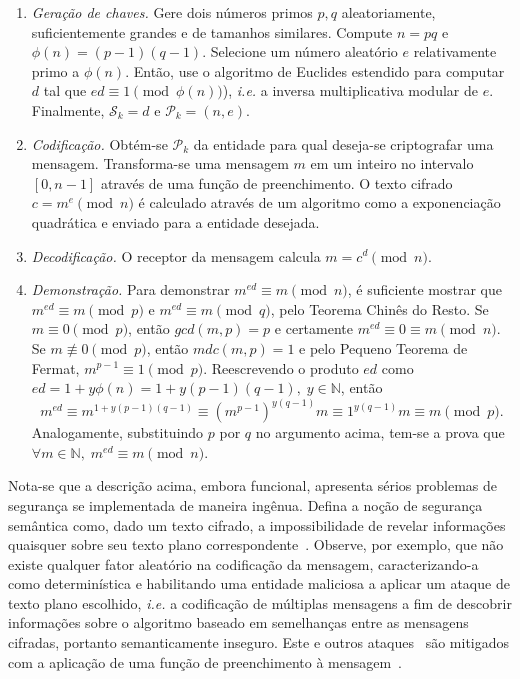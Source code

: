 \documentclass[12pt,notitlepage]{report}
\newcommand{\pk}{\mathcal{P}_k}
\begin{document}
\begin{enumerate}

  \item[] \emph{Geração de chaves.} Gere dois números primos $p, q$
      aleatoriamente, suficientemente grandes e de tamanhos similares. Compute
        $n = p q$ e $\phi(n) = (p - 1) (q - 1)$. Selecione um número aleatório
        $e$ relativamente primo a $\phi(n)$. Então, use o algoritmo de Euclides
        estendido para computar $d$ tal que $ed \equiv 1 \pmod{\phi(n)}$), \emph{i.e.}
        a inversa multiplicativa modular de $e$. Finalmente, $\mathcal{S}_k =
        d$ e $\mathcal{P}_k = (n, e)$.

  \item[] \emph{Codificação.} Obtém-se $\pk{}$ da entidade para qual deseja-se
      criptografar uma mensagem. Transforma-se uma mensagem $m$ em um inteiro
        no intervalo $[0, n - 1]$ através de uma função de preenchimento.  O
        texto cifrado $c = m^e \pmod{n}$ é calculado através de um algoritmo
        como a exponenciação quadrática e enviado para a entidade desejada.

  \item[] \emph{Decodificação.} O receptor da mensagem calcula $m = c^d
      \pmod{n}$.

  \item[] \emph{Demonstração.} Para demonstrar $m^{ed} \equiv m \pmod{n}$, é
      suficiente mostrar que $m^{ed} \equiv m \pmod{p}$ e $m^{ed} \equiv m
        \pmod{q}$, pelo Teorema Chinês do Resto. Se $m \equiv 0 \pmod{p}$,
        então $gcd(m, p) = p$ e certamente $m^{ed} \equiv 0 \equiv m \pmod{n}$.
        Se $m \not\equiv 0 \pmod{p}$, então $mdc(m, p) = 1$ e pelo Pequeno
        Teorema de Fermat, $m^{p - 1} \equiv 1 \pmod{p}$. Reescrevendo o
        produto $ed$ como $ed = 1 + y\phi(n) = 1 + y(p - 1)(q - 1), \; y \in
        \mathbb{N}$, então
        \begin{equation}
          m^{ed} \equiv m^{1 + y(p-1)(q-1)} \equiv
            (m^{p-1})^{y(q-1)}m \equiv 1^{y(q-1)}m \equiv m \pmod{p}.
        \end{equation}
        Analogamente, substituindo $p$ por $q$ no argumento acima, tem-se a
        prova que $\forall m \in \mathbb{N}, \; m^{ed} \equiv m \pmod{n}$.

\end{enumerate}

Nota-se que a descrição acima, embora funcional, apresenta sérios problemas de
segurança se implementada de maneira ingênua. Defina a noção de segurança
semântica como, dado um texto cifrado, a impossibilidade de revelar
informações quaisquer sobre seu texto plano
correspondente~\cite{Goldwasser:1982:PEA:800070.802212}. Observe, por exemplo,
que não existe qualquer fator aleatório na codificação da mensagem,
caracterizando-a como determinística e habilitando uma entidade
maliciosa a aplicar um ataque de texto plano escolhido, \emph{i.e.} a codificação
de múltiplas mensagens a fim de descobrir informações sobre o algoritmo
baseado em semelhanças entre as mensagens cifradas, portanto semanticamente
inseguro. Este e outros ataques~\cite{Boneh99twentyyears} são mitigados com
a aplicação de uma função de preenchimento à mensagem~\cite{Bellare1995}.
\end{document}
